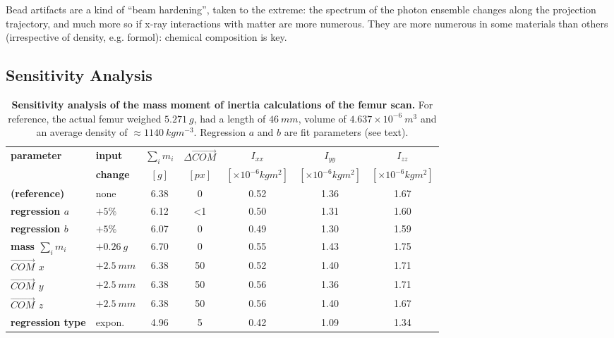 Bead artifacts are a kind of ``beam hardening'', taken to the extreme: the spectrum of the photon ensemble changes along the projection trajectory, and much more so if x-ray interactions with matter are more numerous.
They are more numerous in some materials than others (irrespective of density, e.g. formol): chemical composition is key.
\subsection{Sensitivity Analysis}
\label{sec:orgbf082d4}


\begin{table}[p]
\caption{\label{tab:sensitivity}\textbf{Sensitivity analysis of the mass moment of inertia calculations of the femur scan.} For reference, the actual femur weighed \(5.271\ g\), had a length of \(46\ mm\), volume of \(4.637\times 10^{-6}\ m^{3}\) and an average density of \(\approx 1140\ kg m^{-3}\). Regression \(a\) and \(b\) are fit parameters (see text).}
\centering\footnotesize
\begin{tabular}{|l|l|c|c|c|c|c|}
\hline
\textbf{parameter} & \textbf{input} & \textbf{\(\sum_{i}m_{i}\)} & \textbf{\(\Delta \vec{COM}\)} & \textbf{\(I_{xx}\)} & \textbf{\(I_{yy}\)} & \textbf{\(I_{zz}\)}\\[0pt]
 & \textbf{change} & \([g]\) & \([px]\) & \([\times 10^{-6} kg m^2]\) & \([\times 10^{-6} kg m^2]\) & \([\times 10^{-6} kg m^2]\)\\[0pt]
\hline
\hline
\textbf{(reference)} & none & 6.38 & 0 & 0.52 & 1.36 & 1.67\\[0pt]
\hline
\textbf{regression \(a\)} & \(+5 \%\) & 6.12 & <1 & 0.50 & 1.31 & 1.60\\[0pt]
\textbf{regression \(b\)} & \(+5 \%\) & 6.07 & 0 & 0.49 & 1.30 & 1.59\\[0pt]
\hline
\textbf{mass \(\sum_{i} m_{i}\)} & \(+0.26\ g\) & 6.70 & 0 & 0.55 & 1.43 & 1.75\\[0pt]
\hline
\textbf{\(\vec{COM}\) \(x\)} & \(+2.5\ mm\) & 6.38 & 50 & 0.52 & 1.40 & 1.71\\[0pt]
\textbf{\(\vec{COM}\) \(y\)} & \(+2.5\ mm\) & 6.38 & 50 & 0.56 & 1.36 & 1.71\\[0pt]
\textbf{\(\vec{COM}\) \(z\)} & \(+2.5\ mm\) & 6.38 & 50 & 0.56 & 1.40 & 1.67\\[0pt]
\hline
\textbf{regression type} & expon. & 4.96 & 5 & 0.42 & 1.09 & 1.34\\[0pt]
\hline
\hline
\end{tabular}
\normalsize
\end{table}

